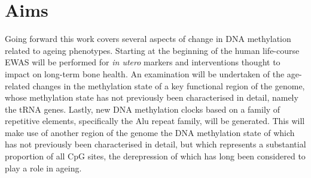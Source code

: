 \documentclass[
]{book}
\begin{document}
\hypertarget{aims}{%
\section{Aims}\label{aims}}

Going forward this work covers several aspects of change in DNA methylation related to ageing phenotypes.
Starting at the beginning of the human life-course EWAS will be performed for \emph{in utero} markers and interventions thought to impact on long-term bone health.
An examination will be undertaken of the age-related changes in the methylation state of a key functional region of the genome, whose methylation state has not previously been characterised in detail, namely the tRNA genes.
Lastly, new DNA methylation clocks based on a family of repetitive elements, specifically the Alu repeat family, will be generated.
This will make use of another region of the genome the DNA methylation state of which has not previously been characterised in detail, but which represents a substantial proportion of all CpG sites, the derepression of which has long been considered to play a role in ageing.
\end{document}
